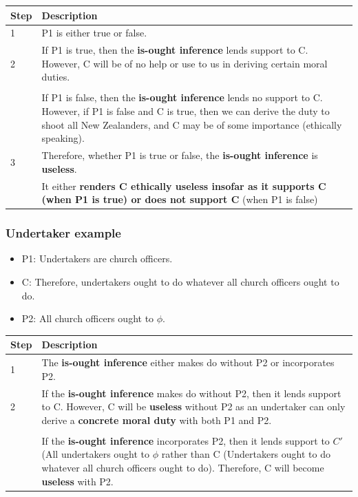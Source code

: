 \documentclass[11pt]{article}
\begin{document}
\begin{center}
\begin{tabular}{|m{5em}|m{25em}|}
\hline
Step & Description\\
\hline
1 & P1 is either true or false.\\
\hline
2 & If P1 is true, then the \textbf{is-ought inference} lends support to C. However, C will be of no help or use to us in deriving certain moral duties.\\
 & \\
 & If P1 is false, then the \textbf{is-ought inference} lends no support to C. However, if P1 is false and C is true, then we can derive the duty to shoot all New Zealanders, and C may be of some importance (ethically speaking).\\
\hline
3 & Therefore, whether P1 is true or false, the \textbf{is-ought inference} is \textbf{useless}.\\
 & It either \textbf{renders C ethically useless insofar as it supports C (when P1 is true) or does not support C} (when P1 is false)\\
\hline
\end{tabular}
\end{center}
 \newpage
\subsubsection{Undertaker example}
\label{sec:orgeed2694}
\begin{itemize}
\item P1: Undertakers are church officers.
\item C: Therefore, undertakers ought to do whatever all church officers ought to do.
\item P2: All church officers ought to \(\phi\).
\end{itemize}

\begin{center}
\begin{tabular}{|m{5em}|m{25em}|}
\hline
Step & Description\\
\hline
1 & The \textbf{is-ought inference} either makes do without P2 or incorporates P2.\\
\hline
2 & If the \textbf{is-ought inference} makes do without P2, then it lends support to C. However, C will be \textbf{useless} without P2 as an undertaker can only derive a \textbf{concrete moral duty} with both P1 and P2.\\
 & \\
 & If the \textbf{is-ought inference} incorporates P2, then it lends support to \(C'\) (All undertakers ought to \(\phi\) rather than C (Undertakers ought to do whatever all church officers ought to do). Therefore, C will become \textbf{useless} with P2.\\
\hline
\end{tabular}
\end{center}
\end{document}
